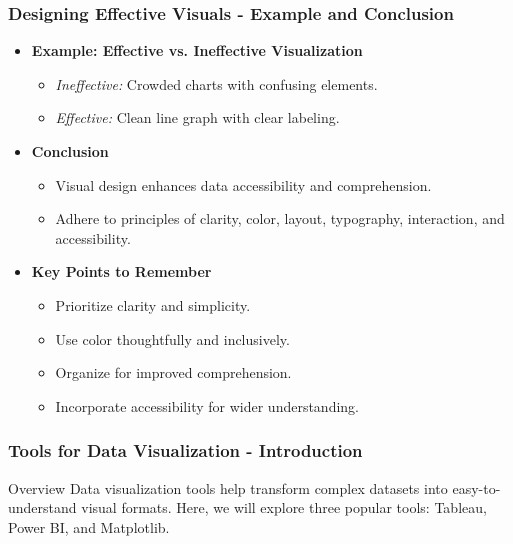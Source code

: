 \documentclass{beamer}
\begin{document}
\begin{frame}[fragile]
    \frametitle{Designing Effective Visuals - Example and Conclusion}
    \begin{itemize}
        \item \textbf{Example: Effective vs. Ineffective Visualization}
        \begin{itemize}
            \item \textit{Ineffective:} Crowded charts with confusing elements.
            \item \textit{Effective:} Clean line graph with clear labeling.
        \end{itemize}
        
        \item \textbf{Conclusion}
        \begin{itemize}
            \item Visual design enhances data accessibility and comprehension.
            \item Adhere to principles of clarity, color, layout, typography, interaction, and accessibility.
        \end{itemize}
        
        \item \textbf{Key Points to Remember}
        \begin{itemize}
            \item Prioritize clarity and simplicity.
            \item Use color thoughtfully and inclusively.
            \item Organize for improved comprehension.
            \item Incorporate accessibility for wider understanding.
        \end{itemize}
    \end{itemize}
\end{frame}

\begin{frame}[fragile]
    \frametitle{Tools for Data Visualization - Introduction}
    \begin{block}{Overview}
        Data visualization tools help transform complex datasets into easy-to-understand visual formats. 
        Here, we will explore three popular tools: Tableau, Power BI, and Matplotlib.
    \end{block}
\end{frame}
\end{document}
